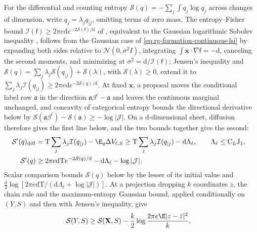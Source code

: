 For the differential and counting entropy
\(\mathcal S(q)=-\sum_j\int q_j\log q_j\) across changes of dimension, write
\(q_j=\lambda_jq_{\mid j}\), omitting terms of zero mass. The entropy--Fisher
bound \(\mathcal I(\mathsf f)\ge2\pi e \mathrm d e^{-2\mathcal S(\mathsf f)/\mathrm d}\)
of \citet{Stam1959}, equivalent to the Gaussian logarithmic Sobolev inequality
\citep{Carlen1991}, follows from the Gaussian case of
\cref{eq:rg-formation-continuous-lsi} by expanding both sides relative to
\(\mathcal N(0,\sigma^2I)\), integrating \(\int\mathbf x\cdot\nabla\mathsf f=-\mathrm d\),
canceling the second moments, and minimizing at
\(\sigma^2=\mathrm d/\mathcal I(\mathsf f)\); Jensen's inequality and
\(\mathcal S(q)=\sum_j\lambda_j\mathcal S(q_{\mid j})+\mathcal S(\lambda)\), with
\(\mathcal S(\lambda)\ge0\), extend it to
\(\sum_j\lambda_j\mathcal I(q_{\mid j})\ge2\pi e \mathrm d e^{-2\mathcal S(q)/\mathrm d}\).
At fixed \(\mathbf x\), a proposal moves the conditional label row
\(\mathfrak a\) in the direction \(\mathfrak a\beta^\ell-\mathfrak a\) and leaves
the continuous marginal unchanged, and concavity of categorical entropy bounds
the directional derivative below by
\(\mathcal S(\mathfrak a\beta^\ell)-\mathcal S(\mathfrak a)\ge-\log|\mathcal J|\).
On a \(\mathrm d\)-dimensional sheet, diffusion therefore gives the first line
below, and the two bounds together give the second:
\begin{align}
 \mathcal S'(q)_{\mathrm{diff}}
 &=\mathrm T\sum_j\lambda_j\mathcal I(q_{\mid j})-\E_q\Delta V_{\ell,S}
 \ge \mathrm T\sum_j\lambda_j\mathcal I(q_{\mid j})-\mathrm d\Lambda_\ell,
 \qquad \Lambda_\ell\le \mathrm C_L\mathrm J_1,
 \label{eq:rg-formation-actual-entropy-derivative}\\
 \mathcal S'(q)&\ge 2\pi e \mathrm d \mathrm T e^{-2\mathcal S(q)/\mathrm d}
                -\mathrm d\Lambda_\ell-\log|\mathcal J|.
 \label{eq:rg-formation-counting-entropy-floor}
\end{align}
Scalar comparison bounds \(\mathcal S(q)\) below by the lesser of its initial
value and
\(\frac{\mathrm d}2\log[2\pi e \mathrm d\mathrm T/(\mathrm d\Lambda_\ell+\log|\mathcal J|)]\).
At a projection dropping \(k\) coordinates \(z\), the chain rule and the
maximum-entropy Gaussian bound, applied conditionally on \((Y,S)\) and then
with Jensen's inequality, give
\begin{equation}
 \mathcal S(Y,S)\ge \mathcal S(\mathbf X,S)
       -\frac k2\log\frac{2\pi e \E|z-\bar z|^2}{k},
 \label{eq:rg-formation-entropy-projection}
\end{equation}
